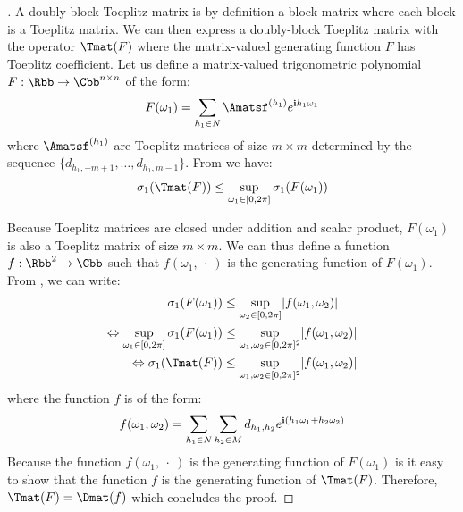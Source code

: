 \begin{proof}[]
  A doubly-block Toeplitz matrix is by definition a block matrix where each block is a Toeplitz matrix.
  We can then express a doubly-block Toeplitz matrix with the operator $\Tmat(F)$ where the matrix-valued generating function $F$ has Toeplitz coefficient.
  Let us define a matrix-valued trigonometric polynomial $F:\Rbb\rightarrow\Cbb^{n \times n}$ of the form:
  \begin{equation}
    F(\omega_1) = \sum_{h_1 \in N} \Amatsf^{(h_1)} e^{\ci h_1\omega_1}
  \end{equation}
  where $\Amatsf^{(h_1)}$ are Toeplitz matrices of size $m \times m$ determined by the sequence $\{d_{h_1, -m+1}, \dots, d_{h_1, m-1} \}$. 
  From  we have:
  \begin{equation}
  \sigma_1\left(\Tmat(F) \right) \leq \sup_{\omega_1 \in [0,2\pi] } \sigma_{1}\left( F(\omega_1) \right) \label{equation:th_bound_block_toeplitz}
  \end{equation}

  Because Toeplitz matrices are closed under addition and scalar product, $F(\omega_1)$ is also a Toeplitz matrix of size $m \times m$. 
  We can thus define a function $f:\Rbb^{2} \rightarrow \Cbb$ such that $f(\omega_1,\ \cdot\ )$ is the generating function of $F(\omega_1)$. From , we can write:
  \begin{align}
      \sigma_{1}\left( F(\omega_1) \right) &\leq \sup_{\omega_2 \in [0,2\pi]} \left| f(\omega_1, \omega_2) \right| \\
      \Leftrightarrow \sup_{\omega_1 \in [0,2\pi]} \sigma_{1}\left( F(\omega_1) \right) &\leq  \sup_{\omega_1, \omega_2 \in [0,2\pi]^2} \left| f(\omega_1, \omega_2) \right| \\
      \Leftrightarrow \sigma_1\left(\Tmat(F) \right) &\leq \sup_{\omega_1, \omega_2 \in [0,2\pi]^2} \left| f(\omega_1, \omega_2) \right|
  \end{align}
  where the function $f$ is of the form:
  \begin{equation}
  f(\omega_1,\omega_2) = \sum_{h_1 \in N} \sum_{h_2 \in M} d_{h_1, h_2} e^{\ci \left( h_1\omega_1 + h_2 \omega_2\right)}
  \end{equation}
  Because the function $f(\omega_1,\ \cdot\ )$ is the generating function of $F(\omega_1)$ is it easy to show that the function $f$ is the generating function of $\Tmat(F)$. Therefore, $\Tmat(F) = \Dmat(f)$ which concludes the proof. 
\end{proof}



